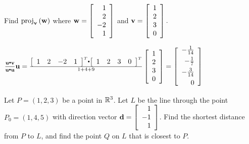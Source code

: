 \begin{enumialphparenastyle}
\begin{ex} Find $\mbox{proj}_{{\bf v}}\left( {\bf w}\right) $ where 
${\bf w}=\left[
\begin{array}{r}
1 \\
2 \\
-2 \\
1
\end{array}
\right] $ and ${\bf v}=\left[ 
\begin{array}{r}
1 \\
2 \\
3 \\
0
\end{array}
\right] .$
\begin{sol}
$\frac{\vect{u}\dotprod \vect{v}}{\vect{u}\dotprod \vect{u}}\vect{u}=\frac{\leftB \begin{array}{cccc}
1 & 2 & -2 & 1 
\end{array}
\rightB^T \dotprod \leftB \begin{array}{cccc}
1 & 2 & 3 & 0
\end{array}
\rightB^T}{1+4+9}\leftB \begin{array}{r}
1 \\
2 \\
3 \\
0
\end{array}
\rightB
=\leftB
\begin{array}{r}
-\vspace{0.05in}\frac{1}{14} \\
-\vspace{0.05in}\frac{1}{7} \\
-\vspace{0.05in}\frac{3}{14} \\
 0
\end{array}
\rightB $
\end{sol}
\end{ex}

\begin{ex} Let $P = (1,2,3)$ be a point in $\mathbb{R}^3$. Let $L$ be the line through the point $P_0 = (1, 4, 5)$ with direction vector ${\bf d} = \left[ \begin{array}{r}
1 \\
-1 \\
1
\end{array} \right]$. Find the shortest distance from $P$ to $L$, and find the point $Q$ on $L$ that is closest to $P$. 
\end{ex}


\end{enumialphparenastyle}

